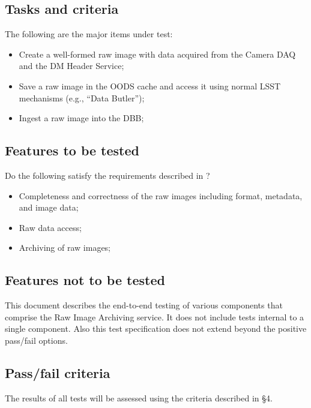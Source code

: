 \documentclass[DM,lsstdraft,STS,toc]{lsstdoc}
\begin{document}
\subsection{Tasks and criteria}
\label{sec:tasks}


The following are the major items under test:


\begin{itemize}
\item{Create a well-formed raw image with data acquired from the Camera DAQ and the DM Header Service; }
\item{Save a raw image in the OODS cache and access it using normal LSST mechanisms (e.g., ``Data Butler''); }
\item{Ingest a raw image into the DBB; }
\end{itemize}




\subsection{Features to be tested}
\label{sec:feat2test}


Do the following satisfy the requirements described in ?
\begin{itemize}
\item{Completeness and correctness of the raw images including format, metadata, and image data;}
\item{Raw data access;}
\item{Archiving of raw images;}
\end{itemize}


\subsection{Features not to be tested}
\label{sec:featnot2test}


This document describes the end-to-end testing of various components
that comprise the Raw Image Archiving service. It does not include tests internal to
a single component. Also this test specification does not
extend beyond the positive pass/fail options.

\subsection{Pass/fail criteria}
\label{sec:passfail}


The results of all tests will be assessed using the criteria described in
 \S4.
\end{document}
